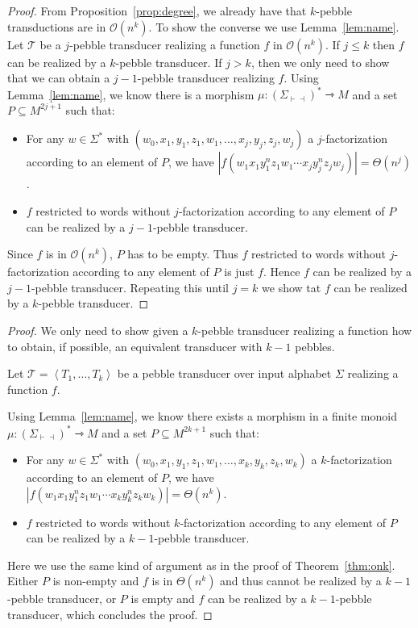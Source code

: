 \documentclass[sigplan,review,anonymous]{acmart}\settopmatter{printfolios=true,printccs=false,printacmref=false}
\newcommand{\atuple}[1]{\left\langle #1 \right\rangle}
\newcommand{\mright}{\rightarrowtriangle}
\newcommand{\Tt}{\mathcal T}
\newcommand{\Oo}{\mathcal O}
\theoremstyle{definition}
\theoremstyle{remark}
\begin{document}
\begin{proof}
    From Proposition~\ref{prop:degree}, we already have that $k$-pebble transductions are in $\Oo(n^k)$.
    To show the converse we use Lemma~\ref{lem:name}.
    Let $\Tt$ be a $j$-pebble transducer realizing a function $f$ in $\Oo(n^k)$.
    If $j\leq k$ then $f$ can be realized by a $k$-pebble transducer. If $j>k$, then we only need to show that we can obtain a $j-1$-pebble transducer realizing $f$. Using Lemma~\ref{lem:name}, we know there is a morphism $\mu:(\Sigma_{\vdash\dashv})^*\mright M$ and a set $P\subseteq M^{2j+1}$ such that:
    \begin{itemize}
    \item For any $w\in \Sigma^*$ with $(w_0,x_{1},y_1,z_1,w_1,\ldots,x_j,y_j,z_j, w_j)$ a $j$-factorization 
     according to an element of $P$, we have $|f(w_1x_1y_{1}^nz_1w_1\cdots x_jy_j^nz_jw_j)|=\Theta(n^j)$.
    \item $f$ restricted to words without $j$-factorization according to any element of $P$ can be realized by a $j{-}1$-pebble transducer.
    \end{itemize}
    Since $f$ is in $\Oo(n^k)$, $P$ has to be empty. Thus $f$ restricted to words without $j$-factorization according to any element of $P$ is just $f$. Hence $f$ can be realized by a $j-1$-pebble transducer.
    Repeating this until $j=k$ we show tat $f$ can be realized by a $k$-pebble transducer.

\end{proof}



\minthm*

\begin{proof}
    We only need to show given a $k$-pebble transducer realizing a function how to obtain, if possible, an equivalent transducer with $k-1$ pebbles.

    Let $\Tt=\atuple{T_1,\ldots,T_k}$ be a pebble transducer over input alphabet $\Sigma$ realizing a function $f$.

    Using Lemma~\ref{lem:name}, we know there exists a morphism in a finite monoid $\mu:(\Sigma_{\vdash\dashv})^*\mright M$ and a set $P\subseteq M^{2k+1}$ such that:
    \begin{itemize}
    \item For any $w\in \Sigma^*$ with $(w_0,x_{1},y_1,z_1,w_1,\ldots,x_k,y_k,z_k, w_k)$ a $k$-factorization 
     according to an element of $P$, we have $|f(w_1x_1y_{1}^nz_1w_1\cdots x_ky_k^nz_kw_k)|=\Theta(n^k)$.
    \item $f$ restricted to words without $k$-factorization according to any element of $P$ can be realized by a $k{-}1$-pebble transducer.
    \end{itemize}
    Here we use the same kind of argument as in the proof of Theorem~\ref{thm:onk}. Either $P$ is non-empty and $f$ is in $\Theta(n^k)$ and thus cannot be realized by a $k{-}1$-pebble transducer, or $P$ is empty and $f$ can be realized by a $k{-}1$-pebble transducer, which concludes the proof.
\end{proof}
\end{document}
